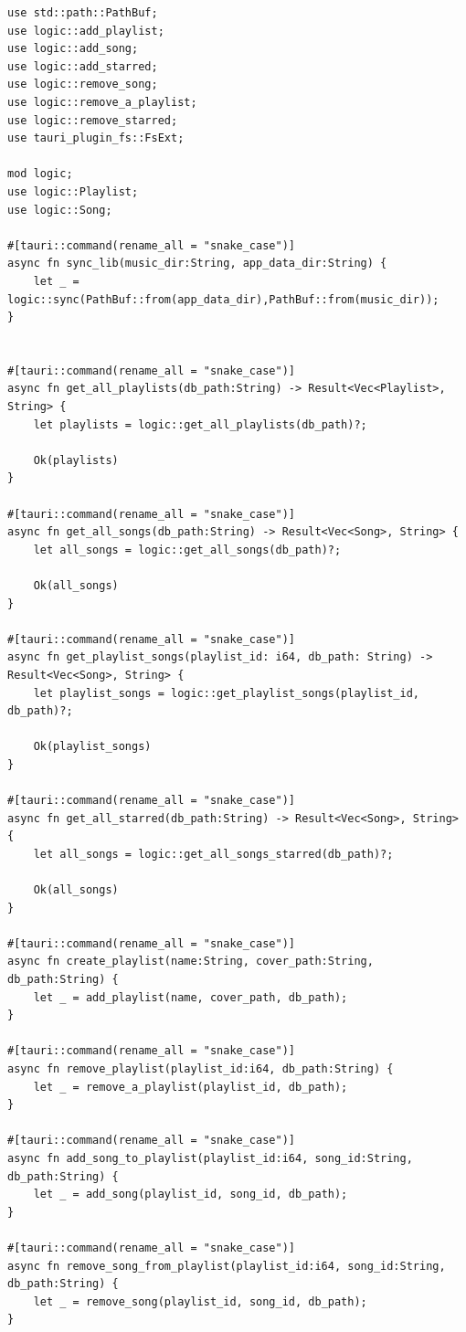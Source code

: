 \documentclass[11pt, a4paper]{article}
\begin{document}
            \begin{lstlisting}[caption={lib.rs}]
use std::path::PathBuf;
use logic::add_playlist;
use logic::add_song;
use logic::add_starred;
use logic::remove_song;
use logic::remove_a_playlist;
use logic::remove_starred;
use tauri_plugin_fs::FsExt;

mod logic;
use logic::Playlist;
use logic::Song;

#[tauri::command(rename_all = "snake_case")]
async fn sync_lib(music_dir:String, app_data_dir:String) {
    let _ = logic::sync(PathBuf::from(app_data_dir),PathBuf::from(music_dir));
}


#[tauri::command(rename_all = "snake_case")]
async fn get_all_playlists(db_path:String) -> Result<Vec<Playlist>, String> {
    let playlists = logic::get_all_playlists(db_path)?;

    Ok(playlists)
}

#[tauri::command(rename_all = "snake_case")]
async fn get_all_songs(db_path:String) -> Result<Vec<Song>, String> {
    let all_songs = logic::get_all_songs(db_path)?;

    Ok(all_songs)
}

#[tauri::command(rename_all = "snake_case")]
async fn get_playlist_songs(playlist_id: i64, db_path: String) -> Result<Vec<Song>, String> {
    let playlist_songs = logic::get_playlist_songs(playlist_id, db_path)?;

    Ok(playlist_songs)
}

#[tauri::command(rename_all = "snake_case")]
async fn get_all_starred(db_path:String) -> Result<Vec<Song>, String> {
    let all_songs = logic::get_all_songs_starred(db_path)?;

    Ok(all_songs)
}

#[tauri::command(rename_all = "snake_case")]
async fn create_playlist(name:String, cover_path:String, db_path:String) {
    let _ = add_playlist(name, cover_path, db_path);
}

#[tauri::command(rename_all = "snake_case")]
async fn remove_playlist(playlist_id:i64, db_path:String) {
    let _ = remove_a_playlist(playlist_id, db_path);
}

#[tauri::command(rename_all = "snake_case")]
async fn add_song_to_playlist(playlist_id:i64, song_id:String, db_path:String) {
    let _ = add_song(playlist_id, song_id, db_path);
}

#[tauri::command(rename_all = "snake_case")]
async fn remove_song_from_playlist(playlist_id:i64, song_id:String, db_path:String) {
    let _ = remove_song(playlist_id, song_id, db_path);
}


\end{lstlisting}
\end{document}
